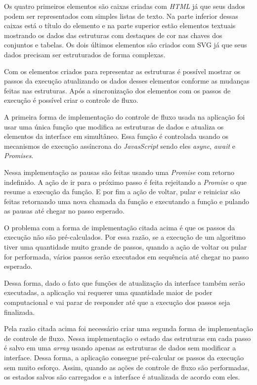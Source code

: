 Os quatro primeiros elementos são caixas criadas com \textit{HTML} já que seus dados podem ser representados com simples listas de texto. Na parte inferior dessas caixas está o título do elemento e na parte superior estão elementos textuais mostrando os dados das estruturas com destaques de cor nas chaves dos conjuntos e tabelas. Os dois últimos elementos são criados com SVG já que seus dados precisam ser estruturados de forma complexas.

Com os elementos criados para representar as estruturas é possível mostrar os passos da execução atualizando os dados desses elementos conforme as mudanças feitas nas estruturas. Após a sincronização dos elementos com os passos de execução é possível criar o controle de fluxo.

A primeira forma de implementação do controle de fluxo usada na aplicação foi usar uma única função que modifica as estruturas de dados e atualiza os elementos da interface em simultâneo. Essa função é controlada usando os mecanismos de execução assíncrona do \textit{JavasScript} sendo eles \textit{async}, \textit{await} e \textit{Promises}.

Nessa implementação as pausas são feitas usando uma \textit{Promise} com retorno indefinido. A ação de ir para o próximo passo é feita rejeitando a \textit{Promise} o que resume a execução da função. E por fim a ação de voltar, pular e reiniciar são feitas retornando uma nova chamada da função e executando a função e pulando as pausas até chegar no passo esperado.

O problema com a forma de implementação citada acima é que os passos da execução não são pré-calculados. Por essa razão, se a execução de um algoritmo tiver uma quantidade muito grande de passos, quando a ação de voltar ou pular for performada, vários passos serão executados em sequência até chegar no passo esperado.

Dessa forma, dado o fato que funções de atualização da interface também serão executadas, a aplicação vai requerer uma quantidade maior de poder computacional e vai parar de responder até que a execução dos passos seja finalizada.

Pela razão citada acima foi necessário criar uma segunda forma de implementação de controle de fluxo. Nessa implementação o estado das estruturas em cada passo é salvo em uma \textit{array} usando apenas as estruturas de dados sem modificar a interface. Dessa forma, a aplicação consegue pré-calcular os passos da execução sem muito esforço. Assim, quando as ações de controle de fluxo são performadas, os estados salvos são carregados e a interface é atualizada de acordo com eles.

